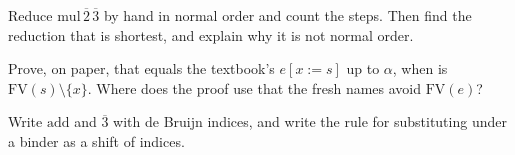 \begin{exercisebox}[Multiplication]
  Reduce $\mathrm{mul}\, \overline 2\, \overline 3$ by hand in normal order and count the
  steps. Then find the reduction that is shortest, and explain why it is not normal order.
\end{exercisebox}

\begin{exercisebox}
  Prove, on paper, that  equals the textbook's
  $e[x := s]$ up to $\alpha$, when  is $\mathrm{FV}(s) \setminus \{x\}$. Where does the
  proof use that the fresh names avoid $\mathrm{FV}(e)$?
\end{exercisebox}

\begin{exercisebox}[Indices]
  Write $\mathrm{add}$ and $\overline 3$ with de Bruijn indices, and write the rule for
  substituting under a binder as a shift of indices.
\end{exercisebox}
